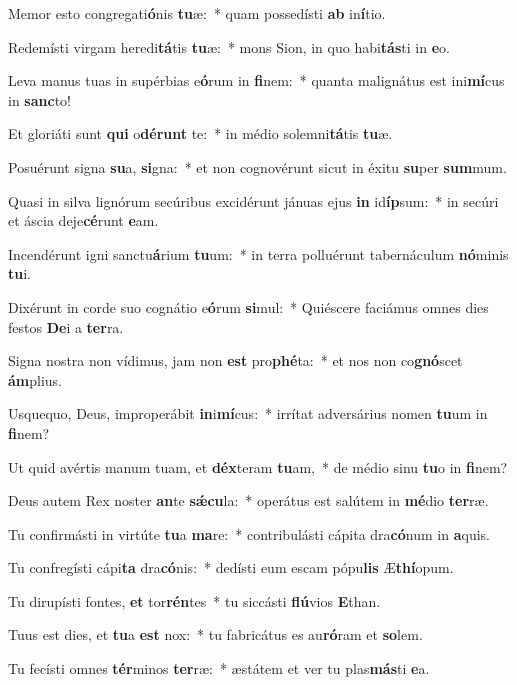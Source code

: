 \item Memor esto congregati\textbf{ó}nis \textbf{tu}æ:~* quam possedísti \textbf{ab} in\textbf{í}tio.
\item Redemísti virgam heredi\textbf{tá}tis \textbf{tu}æ:~* mons Sion, in quo habi\textbf{tás}ti in \textbf{e}o.
\item Leva manus tuas in supérbias e\textbf{ó}rum in \textbf{fi}nem:~* quanta malignátus est ini\textbf{mí}cus in \textbf{sanc}to!
\item Et gloriáti sunt \textbf{qui} o\textbf{dé}\textbf{runt} te:~* in médio solemni\textbf{tá}tis \textbf{tu}æ.
\item Posuérunt signa \textbf{su}a, \textbf{si}gna:~* et non cognovérunt sicut in éxitu \textbf{su}per \textbf{sum}mum.
\item Quasi in silva lignórum secúribus excidérunt jánuas ejus \textbf{in} id\textbf{íp}sum:~* in secúri et áscia deje\textbf{cé}runt \textbf{e}am.
\item Incendérunt igni sanctu\textbf{á}rium \textbf{tu}um:~* in terra polluérunt tabernáculum \textbf{nó}minis \textbf{tu}i.
\item Dixérunt in corde suo cognátio e\textbf{ó}rum \textbf{si}mul:~* Quiéscere faciámus omnes dies festos \textbf{De}i a \textbf{ter}ra.
\item Signa nostra non vídimus, jam non \textbf{est} pro\textbf{phé}ta:~* et nos non co\textbf{gnó}scet \textbf{ám}plius.
\item Usquequo, Deus, improperábit \textbf{in}i\textbf{mí}cus:~* irrítat adversárius nomen \textbf{tu}um in \textbf{fi}nem?
\item Ut quid avértis manum tuam, et \textbf{déx}teram \textbf{tu}am,~* de médio sinu \textbf{tu}o in \textbf{fi}nem?
\item Deus autem Rex noster \textbf{an}te \textbf{sǽ}\textbf{cu}la:~* operátus est salútem in \textbf{mé}dio \textbf{ter}ræ.
\item Tu confirmásti in virtúte \textbf{tu}a \textbf{ma}re:~* contribulásti cápita dra\textbf{có}num in \textbf{a}quis.
\item Tu confregísti cápi\textbf{ta} dra\textbf{có}nis:~* dedísti eum escam pópu\textbf{lis} Æ\textbf{thí}opum.
\item Tu dirupísti fontes, \textbf{et} tor\textbf{rén}tes~* tu siccásti \textbf{flú}vios \textbf{E}than.
\item Tuus est dies, et \textbf{tu}a \textbf{est} nox:~* tu fabricátus es au\textbf{ró}ram et \textbf{so}lem.
\item Tu fecísti omnes \textbf{tér}minos \textbf{ter}ræ:~* æstátem et ver tu plas\textbf{más}ti \textbf{e}a.
